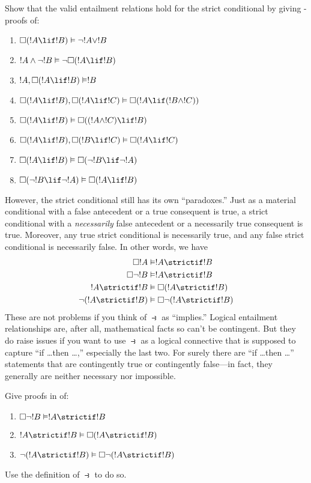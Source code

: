 \documentclass[../../../include/open-logic-section]{subfiles}
\begin{document}
\begin{prob}
  Show that the valid entailment relations hold for the strict
  conditional by giving -proofs of:
  \begin{enumerate}
  \item  $\Box(!A \lif !B) \Entails \lnot !A \lor !B$
  \item $!A \land \lnot !B \Entails \lnot\Box(!A \lif !B)$
  \item $!A, \Box(!A \lif !B) \Entails !B$
  \item $\Box(!A \lif !B), \Box(!A \lif !C) \Entails \Box(!A \lif (!B
    \land !C))$
  \item $\Box(!A \lif !B) \Entails \Box((!A \land !C) \lif !B)$
  \item $\Box(!A \lif !B), \Box(!B \lif !C) \Entails \Box(!A
    \lif !C)$
  \item $\Box(!A \lif !B) \Entails \Box(\lnot !B \lif \lnot !A)$
  \item $\Box(\lnot !B \lif \lnot !A) \Entails \Box(!A \lif !B)$
  \end{enumerate}
  \end{prob}

However, the strict conditional still has its own ``paradoxes.'' Just
as a material conditional with a false antecedent or a true consequent
is true, a strict conditional with a \emph{necessarily} false
antecedent or a necessarily true consequent is true. Moreover, any
true strict conditional is necessarily true, and any false strict
conditional is necessarily false. In other words, we have
\begin{align}
  \Box !A & \Entails !A \strictif !B\\
  \Box \lnot !B & \Entails !A \strictif !B\\
  !A \strictif !B& \Entails \Box(!A \strictif !B)\\
  \lnot(!A \strictif !B) & \Entails \Box\lnot(!A \strictif !B)
\end{align}
These are not problems if you think of $\strictif$ as ``implies.''
Logical entailment relationships are, after all, mathematical facts so
can't be contingent. But they do raise issues if you want to use
$\strictif$ as a logical connective that is supposed to capture ``if
\dots then \dots,'' especially the last two. For surely there are ``if
\dots then \dots'' statements that are contingently true or
contingently false---in fact, they generally are neither necessary nor
impossible.

\begin{prob}
  Give proofs in  of:
  \begin{enumerate}
    \item  $\Box \lnot !B \Entails !A \strictif !B$
    \item $!A \strictif !B \Entails \Box(!A \strictif !B)$
    \item $\lnot(!A \strictif !B)  \Entails \Box\lnot(!A \strictif !B)$
  \end{enumerate}
  Use the definition of $\strictif$ to do so.
\end{prob}
\end{document}
